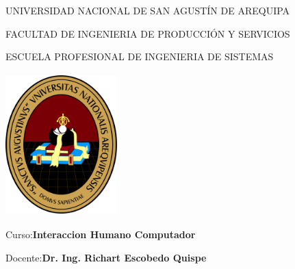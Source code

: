 \documentclass[11pt]{article}
\begin{document}
	\begin{mdframed}
		\doublespacing
		\begin{center}
			\vspace{5mm}
			\begin{Large}
				UNIVERSIDAD NACIONAL DE SAN AGUSTÍN DE AREQUIPA\\
			\end{Large}
				
			\begin{large}
				FACULTAD DE INGENIERIA DE PRODUCCIÓN Y SERVICIOS\\
			\end{large}
			\begin{normalsize}
				ESCUELA PROFESIONAL DE INGENIERIA DE SISTEMAS\\
			\end{normalsize}
			
			\vspace{14mm}
			\includegraphics[width=4.3cm, height=5.5cm]{logoUNSA}
			\vspace{14mm}
		\end{center}
		\onehalfspacing	
		\begin{flushleft}
			\begin{large}
				Curso\tab:\textbf{Interaccion Humano Computador}\\
			\end{large}
			\vspace{5mm}
			\begin{normalsize}
				Docente\tab:\textbf{Dr. Ing. Richart Escobedo Quispe}\\
				

\end{normalsize}
\end{flushleft}
\end{mdframed}
\end{document}
